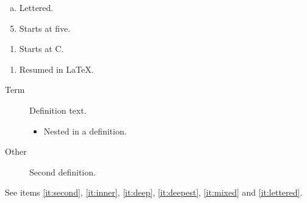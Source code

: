\documentclass{article}
\begin{document}
\begin{enumerate}[(a)]
\item Lettered. \label{it:lettered}
\end{enumerate}

\begin{enumerate}
\setcounter{enumi}{4}
\item Starts at five.
\end{enumerate}

\begin{enumerate}[label=\Alph*., start=3]
\item Starts at C.
\end{enumerate}

\begin{enumerate}[resume]
\item Resumed in LaTeX.
\end{enumerate}

\begin{description}
\item[Term] Definition text.
  \begin{itemize}
  \item Nested in a definition.
  \end{itemize}
\item[Other] Second definition.
\end{description}

See items \ref{it:second}, \ref{it:inner}, \ref{it:deep}, \ref{it:deepest}, \ref{it:mixed} and \ref{it:lettered}.
\end{document}
